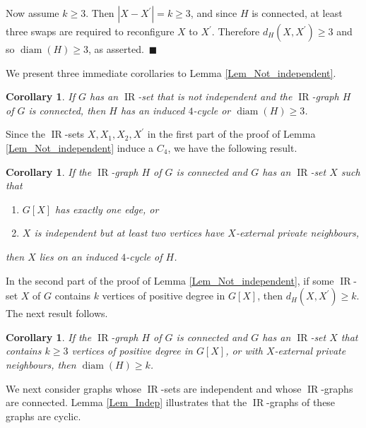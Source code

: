 \documentclass[12pt]{article}%
\newtheorem{corollary}[theorem]{Corollary}
\begin{document}
Now assume $k\geq3$. Then $|X-X^{\prime}|=k\geq3$, and since $H$ is connected,
at least three swaps are required to reconfigure $X$ to $X^{\prime}$.
Therefore $d_{H}(X,X^{\prime})\geq3$ and so $\operatorname{diam}(H)\geq3$, as
asserted.~$\blacksquare$

\bigskip

We present three immediate corollaries to Lemma \ref{Lem_Not_independent}.

\begin{corollary}
\label{Cor_Not_independent}If $G$ has an $\operatorname{IR}$-set that is not
independent and the $\operatorname{IR}$-graph $H$ of $G$ is connected, then
$H$ has an induced $4$-cycle or $\operatorname{diam}(H)\geq3$.
\end{corollary}

Since the $\operatorname{IR}$-sets $X,X_{1},X_{2},X^{\prime}$ in the first
part of the proof of Lemma \ref{Lem_Not_independent} induce a $C_{4}$, we have
the following result.

\begin{corollary}
\label{Cor_C4}If the $\operatorname{IR}$-graph $H$ of $G$ is connected and $G$
has an $\operatorname{IR}$-set $X$ such that

\begin{enumerate}
\item[$(i)$] $G[X]$ has exactly one edge, or

\item[$(ii)$] $X$ is independent but at least two vertices have $X$-external
private neighbours,
\end{enumerate}

then $X$ lies on an induced $4$-cycle of $H$.
\end{corollary}

In the second part of the proof of Lemma \ref{Lem_Not_independent}, if some
$\operatorname{IR}$-set $X$ of $G$ contains $k$ vertices of positive degree in
$G[X]$, then $d_{H}(X,X^{\prime})\geq k$. The next result follows.

\begin{corollary}
\label{Cor_Number_IR-sets1}If the $\operatorname{IR}$-graph $H$ of $G$ is
connected and $G$ has an $\operatorname{IR}$-set $X$ that contains $k\geq3$
vertices of positive degree in $G[X]$, or with $X$-external private
neighbours, then $\operatorname{diam}(H)\geq k$.
\end{corollary}

We next consider graphs whose $\operatorname{IR}$-sets are independent and
whose $\operatorname{IR}$-graphs are connected. Lemma \ref{Lem_Indep}
illustrates that the $\operatorname{IR}$-graphs of these graphs are cyclic.
\end{document}

